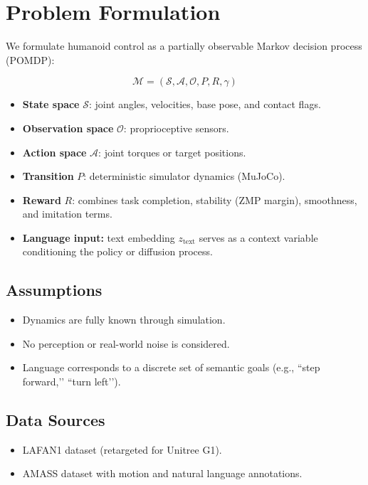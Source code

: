 \section{Problem Formulation}
\label{sec:formulation}

We formulate humanoid control as a partially observable Markov decision process (POMDP):

\[
\mathcal{M} = (\mathcal{S}, \mathcal{A}, \mathcal{O}, P, R, \gamma)
\]

\begin{itemize}
    \item \textbf{State space} $\mathcal{S}$: joint angles, velocities, base pose, and contact flags.
    \item \textbf{Observation space} $\mathcal{O}$: proprioceptive sensors.
    \item \textbf{Action space} $\mathcal{A}$: joint torques or target positions.
    \item \textbf{Transition} $P$: deterministic simulator dynamics (MuJoCo).
    \item \textbf{Reward} $R$: combines task completion, stability (ZMP margin), smoothness, and imitation terms.
    \item \textbf{Language input:} text embedding $z_{\text{text}}$ serves as a context variable conditioning the policy or diffusion process.
\end{itemize}

\subsection{Assumptions}
\begin{itemize}
    \item Dynamics are fully known through simulation.
    \item No perception or real-world noise is considered.
    \item Language corresponds to a discrete set of semantic goals (e.g., ``step forward,’’ ``turn left’’).
\end{itemize}

\subsection{Data Sources}
\begin{itemize}
    \item LAFAN1 dataset (retargeted for Unitree G1).
    \item AMASS dataset with motion and natural language annotations.
\end{itemize}


